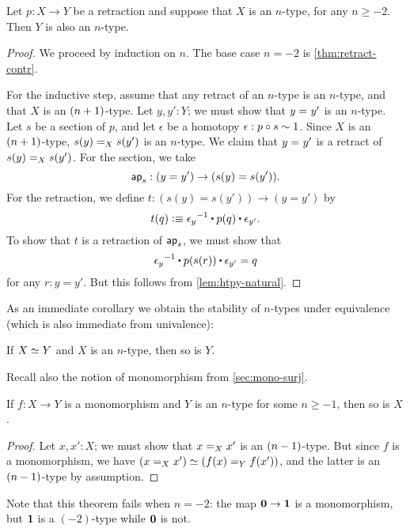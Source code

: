 \begin{thm}\label{thm:h-level-retracts}
 Let $p : X \to Y$ be a retraction and suppose that $X$ is an $n$-type, for any $n\geq -2$.
 Then $Y$ is also an $n$-type.
\end{thm}

\begin{proof}
 We proceed by induction on $n$.
 The base case $n=-2$ is \autoref{thm:retract-contr}.

 For the inductive step, assume that any retract of an $n$-type is an $n$-type, and that $X$ is an $\nplusone$-type.
 Let $y, y' : Y$; we must show that $\id{y}{y'}$ is an $n$-type.
 Let $s$ be a section of $p$, and let $\epsilon$ be a homotopy $\epsilon : p \circ s \htpy 1$.
 Since $X$ is an $\nplusone$-type, $\id[X]{s(y)}{s(y')}$ is an $n$-type.
 We claim that $\id{y}{y'}$ is a retract of $\id[X]{s(y)}{s(y')}$.
 For the section, we take
 \[ \apfunc s : (y=y') \to (s(y)=s(y')). \]
 For the retraction, we define $t:(s(y)=s(y'))\to(y=y')$ by
 \[ t(q) \defeq  \opp{\epsilon_y} \ct \ap p q \ct \epsilon_{y'}.\]
 To show that $t$ is a retraction of $\apfunc s$, we must show that
 \[ \opp{\epsilon_y} \ct \ap p {\ap sr} \ct \epsilon_{y'} = q \]
 for any $r:y=y'$.
 But this follows from \autoref{lem:htpy-natural}.
\end{proof}

As an immediate corollary we obtain the stability of $n$-types under equivalence (which is also immediate from univalence):

\begin{cor}\label{cor:preservation-hlevels-weq}
 If $\eqv{X}{Y}$ and $X$ is an $n$-type, then so is $Y$.
\end{cor}

Recall also the notion of monomorphism from \autoref{sec:mono-surj}.

\begin{thm}\label{thm:isntype-mono}
  If $f:X\to Y$ is a monomorphism and $Y$ is an $n$-type for some $n\ge -1$, then so is $X$.
\end{thm}
\begin{proof}
  Let $x,x':X$; we must show that $\id[X]{x}{x'}$ is an $\nminusone$-type.
  But since $f$ is a monomorphism, we have $(\id[X]{x}{x'}) \simeq (\id[Y]{f(x)}{f(x')})$, and the latter is an $\nminusone$-type by assumption.
\end{proof}

Note that this theorem fails when $n=-2$: the map $\emptyt \to \unit$ is a monomorphism, but $\unit$ is a $(-2)$-type while $\emptyt$ is not.

